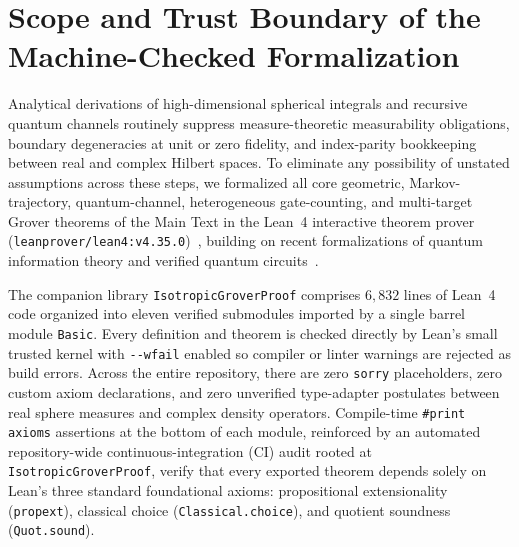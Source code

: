 \providecommand{\mref}[2]{\ifarXivunified\hyperref[#1]{#2}\else #2\fi}
\providecommand{\ragcell}{\setlength{\rightskip}{0pt plus 1fil}}

\section{Scope and Trust Boundary of the Machine-Checked Formalization}
\label{sec:supp-overview}

Analytical derivations of high-dimensional spherical integrals and recursive quantum channels routinely suppress measure-theoretic measurability obligations, boundary degeneracies at unit or zero fidelity, and index-parity bookkeeping between real and complex Hilbert spaces. To eliminate any possibility of unstated assumptions across these steps, we formalized all core geometric, Markov-trajectory, quantum-channel, heterogeneous gate-counting, and multi-target Grover theorems of the Main Text in the Lean~4 interactive theorem prover (\texttt{leanprover/lean4:v4.35.0})~\cite{MouraUllrich2021,Mathlib2020}, building on recent formalizations of quantum information theory and verified quantum circuits~\cite{Meiburg2025,Shirobokov2026}.

The companion library \texttt{IsotropicGroverProof} comprises $6{,}832$ lines of Lean~4 code organized into eleven verified submodules imported by a single barrel module \texttt{Basic}. Every definition and theorem is checked directly by Lean's small trusted kernel with \texttt{-{}-wfail} enabled so compiler or linter warnings are rejected as build errors. Across the entire repository, there are zero \texttt{sorry} placeholders, zero custom axiom declarations, and zero unverified type-adapter postulates between real sphere measures and complex density operators. Compile-time \texttt{\#print axioms} assertions at the bottom of each module, reinforced by an automated repository-wide continuous-integration (CI) audit rooted at \texttt{IsotropicGroverProof}, verify that every exported theorem depends solely on Lean's three standard foundational axioms: propositional extensionality (\texttt{propext}), classical choice (\texttt{Classical.choice}), and quotient soundness (\texttt{Quot.sound}).

